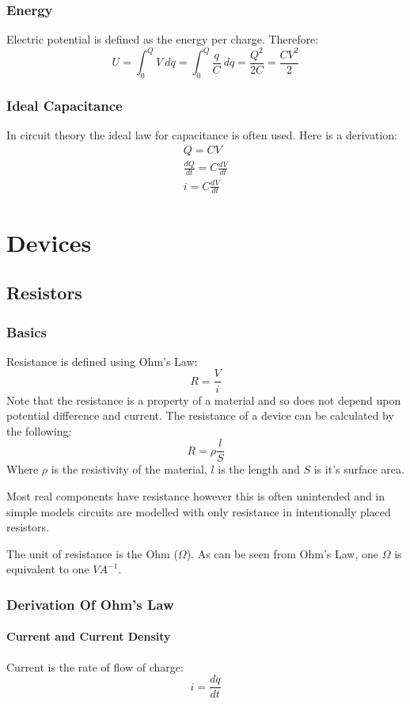 \documentclass[11pt,a4paper]{report}
\begin{document}
\subsection{Energy}
Electric potential is defined as the energy per charge. Therefore:
\begin{equation*}
	U = \int_0^Q V \: dq = \int_0^Q \frac{q}{C} \: dq = \frac{Q^2}{2C} = \frac{CV^2}{2}
\end{equation*}

\subsection{Ideal Capacitance}
In circuit theory the ideal law for capacitance is often used. Here is a derivation:
\begin{eqnarray*}
	Q = CV \\
	\frac{dQ}{dt} = C \frac{dV}{dt} \\
	i = C \frac{dV}{dt}
\end{eqnarray*}

\chapter{Devices}
\section{Resistors}
\subsection{Basics}
Resistance is defined using Ohm's Law:
\[R=\frac{V}{i}\] Note that the resistance is a property of a material and so does not depend upon potential difference and current. The resistance of a device can be calculated by the following:
\[R=\rho\frac{l}{S}\] Where $\rho$ is the resistivity of the material, $l$ is the length and $S$ is it's surface area.

Most real components have resistance however this is often unintended and in simple models circuits are modelled with only resistance in intentionally placed resistors.

The unit of resistance is the Ohm ($\Omega$). As can be seen from Ohm's Law, one $\Omega$ is equivalent to one $VA^{-1}$.

\subsection{Derivation Of Ohm's Law}
\subsubsection{Current and Current Density}
Current is the rate of flow of charge:
\[i=\frac{dq}{dt}\]
\end{document}

